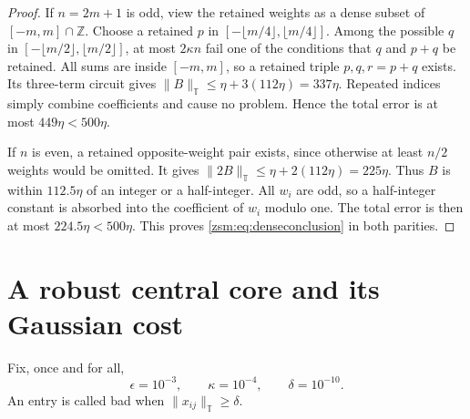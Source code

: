 \documentclass[11pt]{article}
\theoremstyle{definition}\newtheorem{definition}[theorem]{Definition}
\theoremstyle{remark}\newtheorem{remark}[theorem]{Remark}
\newcommand{\Z}{\mathbb Z}
\newcommand{\T}{\mathbb T}
\newcommand{\normT}[1]{\lVert #1\rVert_{\T}}
\begin{document}
\begin{proof}
If $n=2m+1$ is odd, view the retained weights as a dense subset of
$[-m,m]\cap\Z$. Choose a retained $p$ in
$[-\lfloor m/4\rfloor,\lfloor m/4\rfloor]$. Among the possible $q$ in
$[-\lfloor m/2\rfloor,\lfloor m/2\rfloor]$, at most $2\kappa n$ fail one of
the conditions that $q$ and $p+q$ be retained. All sums are inside $[-m,m]$,
so a retained triple $p,q,r=p+q$ exists. Its three-term circuit gives
$\normT{B}\le\eta+3(112\eta)=337\eta$. Repeated indices simply combine
coefficients and cause no problem. Hence the total error is at most
$449\eta<500\eta$.

If $n$ is even, a retained opposite-weight pair exists, since otherwise at
least $n/2$ weights would be omitted. It gives
$\normT{2B}\le\eta+2(112\eta)=225\eta$. Thus $B$ is within $112.5\eta$ of
an integer or a half-integer. All $w_i$ are odd, so a half-integer constant is
absorbed into the coefficient of $w_i$ modulo one. The total error is then at
most $224.5\eta<500\eta$. This proves \eqref{zsm:eq:denseconclusion} in both
parities.
\end{proof}

\section{A robust central core and its Gaussian cost}\label{zsm:sec:core}
Fix, once and for all,
\begin{equation}\label{zsm:eq:smallconstants}
 \epsilon=10^{-3},\qquad\kappa=10^{-4},\qquad\delta=10^{-10}.
\end{equation}
An entry is called bad when $\normT{x_{ij}}\ge\delta$.
\end{document}
